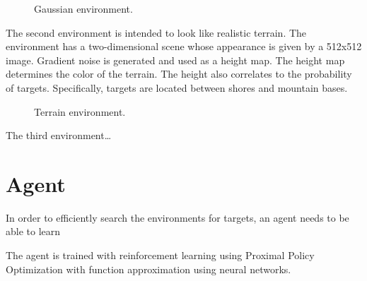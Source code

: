 \begin{figure}
    \centering
    
    \label{fig:gaussian}
    \caption{Gaussian environment.}
\end{figure}

The second environment is intended to look like realistic terrain.
The environment has a two-dimensional scene whose appearance is given by a 512x512 image.
Gradient noise is generated and used as a height map.
The height map determines the color of the terrain.
The height also correlates to the probability of targets.
Specifically, targets are located between shores and mountain bases.

\begin{figure}
    \centering
    
    \label{fig:terrain}
    \caption{Terrain environment.}
\end{figure}

The third environment\dots




\section{Agent}
\label{sec:algorithm}


In order to efficiently search the environments for targets, an agent needs to be able to learn 

The agent is trained with reinforcement learning using Proximal Policy Optimization with function approximation using neural networks. 




